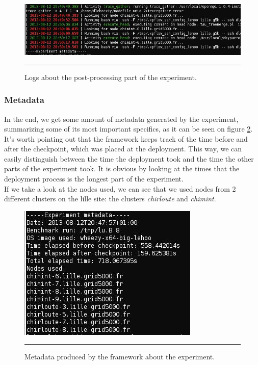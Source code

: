 \begin{figure}[htbp]
  \centering
    \includegraphics[scale=0.6]{./Figures/fex_postprocessing.jpg}
    \rule{35em}{0.5pt}
  \caption[Post-processing]{Logs about the post-processing part of the
    experiment.}
  \label{fig:fex_postprocessing}
\end{figure}

\subsubsection{Metadata}
In the end, we get some amount of metadata generated by the
experiment, summarizing some of its most important specifics, as it
can be seen on figure \ref{fig:fex_metadata}.\\
It's worth pointing out that the framework keeps track of the time
before and after the checkpoint, which was placed at the
deployment. This way, we can easily distinguish between the time the
deployment took and the time the other parts of the experiment
took. It is obvious by looking at the times that the deployment
process is the longest part of the experiment.\\
If we take a look at the nodes used, we can see that we used nodes
from 2 different clusters on the lille site: the
clusters \emph{chirloute} and \emph{chimint}.

\begin{figure}[htbp]
  \centering
    \includegraphics[scale=0.7]{./Figures/fex_metadata.jpg}
    \rule{35em}{0.5pt}
  \caption[Metadata]{Metadata produced by the framework about the
    experiment.}
  \label{fig:fex_metadata}
\end{figure}

